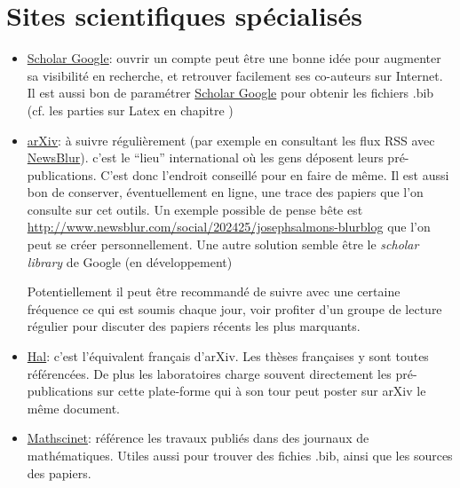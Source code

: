 \section{Sites scientifiques spécialisés}



\begin{itemize}
\item \href{http://scholar.google.com}{Scholar Google}:
ouvrir un compte peut être une bonne idée pour augmenter sa visibilité en recherche,
et retrouver facilement ses co-auteurs sur Internet.
Il est aussi bon de paramétrer \href{http://scholar.google.com}{Scholar Google} pour
obtenir les fichiers  .bib (cf. les parties sur Latex en chapitre )

\item \href{http://arxiv.org/}{arXiv}:
\`a suivre régulièrement (par exemple en consultant les flux RSS avec 
\href{https://www.newsblur.com/}{NewsBlur}). 
c'est le ``lieu'' international
où les gens déposent leurs pré-publications. C'est donc l'endroit conseillé pour en faire
de même. Il est aussi bon de conserver, éventuellement en ligne, une trace des papiers que
l'on consulte sur cet outils. Un exemple possible de pense bête est 
\href{http://www.newsblur.com/social/202425/josephsalmons-blurblog}
{http://www.newsblur.com/social/202425/josephsalmons-blurblog}
que l'on peut se créer personnellement. Une autre solution semble \^etre 
le \textit{scholar library} de Google
(en développement)


Potentiellement il peut être recommandé de suivre avec une certaine fréquence ce qui est soumis
chaque jour, voir profiter d'un groupe de lecture régulier pour discuter des papiers récents les plus
marquants.

\item \href{http://hal.archives-ouvertes.fr/}{Hal}: c'est l'équivalent français d'arXiv.
Les thèses françaises y sont toutes référencées. De plus les laboratoires charge souvent directement
les pré-publications sur cette plate-forme qui \`a son tour peut poster sur arXiv le m\^eme document.


\item \href{http://www.ams.org/mathscinet/}{Mathscinet}: référence les travaux publiés dans
des journaux de mathématiques. Utiles aussi pour trouver des fichies .bib, ainsi que les sources
des papiers. 

\end{itemize}






